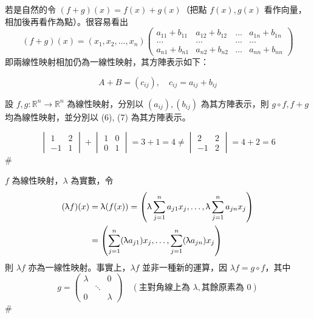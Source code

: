 若是自然的令 $(f+g)(x) = f(x) + g(x)$（把點 $f(x), g(x)$ 看作向量，相加後再看作為點）。很容易看出
\[ (f+g)(x) = (x_1, x_2, \dots, x_n) \begin{pmatrix}
a_{11}+b_{11} & a_{12}+b_{12} & \dots & a_{1n}+b_{1n} \\
\dots & \dots & \dots & \dots \\
a_{n1}+b_{n1} & a_{n2}+b_{n2} & \dots & a_{nn}+b_{nn}
\end{pmatrix} \]
即兩線性映射相加仍為一線性映射，其方陣表示如下：

\begin{definition*}\label{def:b6s-1-10}
\begin{equation}
A+B = (c_{ij}), \quad c_{ij} = a_{ij} + b_{ij} \label{eq:b6s-1-7-7}
\end{equation}
\end{definition*}

\begin{theorem}\label{thm:b6s-1-19}
設 $f, g: \mathbb{R}^n \longrightarrow \mathbb{R}^n$ 為線性映射，分別以 $(a_{ij}), (b_{ij})$ 為其方陣表示，則 $g \circ f, f+g$ 均為線性映射，並分別以 (6), (7) 為其方陣表示。
\end{theorem}

\begin{example}\label{ex:b6s-1-36}
\[ \begin{vmatrix} 1 & 2 \\ -1 & 1 \end{vmatrix} + \begin{vmatrix} 1 & 0 \\ 0 & 1 \end{vmatrix} = 3 + 1 = 4 \ne \begin{vmatrix} 2 & 2 \\ -1 & 2 \end{vmatrix} = 4 + 2 = 6 \]\hfill$\#$
\end{example}

\begin{discussion}\label{disc:b6s-1-3}
$f$ 為線性映射，$\lambda$ 為實數，令
\begin{align}
(\lambda f)(x) &= \lambda (f(x)) = \left(\lambda \sum_{j=1}^n a_{j1} x_j, \dots, \lambda \sum_{j=1}^n a_{jn} x_j\right) \notag \\
&= \left(\sum_{j=1}^n (\lambda a_{j1}) x_j, \dots, \sum_{j=1}^n (\lambda a_{jn}) x_j\right) \label{eq:b6s-1-7-8}
\end{align}
則 $\lambda f$ 亦為一線性映射。事實上，$\lambda f$ 並非一種新的運算，因 $\lambda f = g \circ f$，其中
\[ g = \begin{pmatrix}
\lambda & & 0 \\
& \ddots & \\
0 & & \lambda
\end{pmatrix} \quad (\text{主對角線上為 } \lambda, \text{其餘原素為 } 0) \]\hfill$\#$
\end{discussion}

